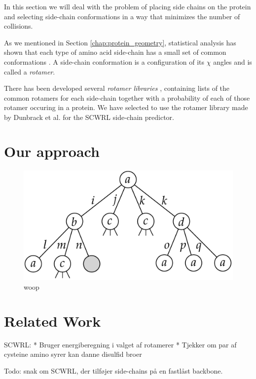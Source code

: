 In this section we will deal with the problem of placing side chains
on the protein and selecting side-chain conformations in a way that
minimizes the number of collisions.

As we mentioned in Section \ref{chap:protein_geometry}, statistical
analysis has shown that each type of amino acid side-chain has a small
set of common conformations \cite{dunbrack2002rotamer}. A side-chain
conformation is a configuration of its $\chi$ angles and is called a
\textit{rotamer}.

There has been developed several \textit{rotamer libraries}
\cite{dunbrack2002rotamer, lovell2000penultimate}, containing lists of
the common rotamers for each side-chain together with a probability of
each of those rotamer occuring in a protein. We have selected to use
the rotamer library made by Dunbrack et al. for the SCWRL side-chain
predictor.

\section{Our approach}

\begin{figure}
	\centering
	\includegraphics[width=.9\columnwidth]{figures/rotamersearch}
	\caption{woop}
\end{figure}


\section{Related Work}
SCWRL: 
 * Bruger energiberegning i valget af rotamerer
 * Tjekker om par af cysteine amino syrer kan danne disulfid broer


Todo: snak om SCWRL, der tilføjer side-chains på en fastlåst backbone.


